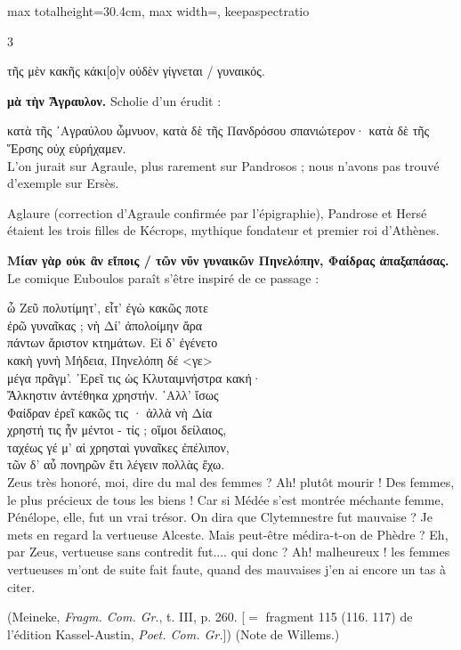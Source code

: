 \documentclass[11pt,twoside]{book}
\newcommand{\italique}[1]{\textit{#1}}
\newcommand{\citComm}[1]{\begin{quoting}[vskip=0.4pt,leftmargin=0.7em,rightmargin=0.2em]#1\end{quoting}}
\newcommand{\francais}[1]{{\policeFr #1}}
\begin{document}
\begin{adjustbox}{max totalheight=30.4cm, max width=\textwidth, keepaspectratio}
\begin{minipage}{\textwidth}
{\begin{multicols}{3}
\citComm{τῆς μὲν κακῆς κάκι[ο]ν οὐδὲν γίγνεται / γυναικός.}
\par\vspace{1.5pt}
 \textbf{μὰ τὴν Ἄγραυλον.} Scholie d'un érudit :
\citComm{κατὰ τῆς ᾿Αγραύλου ὦμνυον, κατὰ δὲ τῆς Πανδρόσου σπανιώτερον· κατὰ δὲ τῆς Ἕρσης οὐχ εὑρήχαμεν.\\
\francais{L'on jurait sur Agraule, plus rarement sur Pandrosos ; nous n'avons pas trouvé d'exemple sur Ersès.}}
\par\vspace{1.5pt}
\noindent Aglaure (correction d'Agraule confirmée par l'épigraphie), Pandrose et Hersé étaient les trois filles de Kécrops, mythique fondateur et premier roi d'Athènes.
\par\vspace{1.5pt}
 \textbf{Μίαν γὰρ οὐκ ἂν εἴποις / τῶν νῦν γυναικῶν Πηνελόπην, Φαίδρας ἁπαξαπάσας.} Le comique Euboulos paraît s'être inspiré de ce passage :
\citComm{ὦ Ζεῦ πολυτίμητ', εἶτ' ἐγὼ κακῶς ποτε\\
ἐρῶ γυναῖκας ; νὴ Δί' ἀπολοίμην ἄρα\\
πάντων ἄριστον κτημάτων. Εἰ δ' ἐγένετο\\
κακὴ γυνὴ Μήδεια, Πηνελόπη δέ <γε>\\
μέγα πρᾶγμ'. ᾿Ερεῖ τις ὡς Κλυταιμνήστρα κακή·\\
Ἄλκηστιν ἀντέθηκα χρηστήν. ᾿Αλλ' ἴσως\\
Φαίδραν ἐρεῖ κακῶς τις · ἀλλὰ νὴ Δία\\
χρηστή τις ἦν μέντοι - τίς ; οἴμοι δείλαιος,\\
ταχέως γέ μ' αἱ χρησταὶ γυναῖκες ἐπέλιπον,\\
τῶν δ' αὖ πονηρῶν ἔτι λέγειν πολλὰς ἔχω.\\
\francais{Zeus très honoré, moi, dire du mal des femmes ? Ah! plutôt mourir ! Des femmes, le plus précieux de tous les biens ! Car si Médée s'est montrée méchante femme, Pénélope, elle, fut un vrai trésor. On dira que Clytemnestre fut mauvaise ? Je mets en regard la vertueuse Alceste. Mais peut-être médira-t-on de Phèdre ? Eh, par Zeus, vertueuse sans contredit fut.... qui donc ? Ah! malheureux ! les femmes vertueuses m'ont de suite fait faute, quand des mauvaises j'en ai encore un tas à citer.}}
\par\vspace{1.5pt}
\noindent (Meineke, \italique{Fragm. Com. Gr}., t. III, p. 260. [$=$ fragment 115 (116. 117) de l'édition Kassel-Austin, \italique{Poet. Com. Gr.}]) (Note de Willems.)

\end{multicols}}
\end{minipage}
\end{adjustbox}
\end{document}
